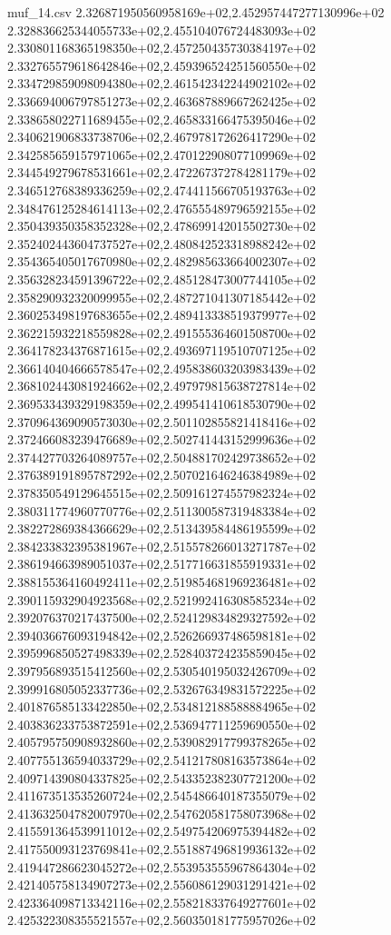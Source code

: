 \begin{filecontents*}{muf_14.csv}
2.326871950560958169e+02,2.452957447277130996e+02
2.328836625344055733e+02,2.455104076724483093e+02
2.330801168365198350e+02,2.457250435730384197e+02
2.332765579618642846e+02,2.459396524251560550e+02
2.334729859098094380e+02,2.461542342244902102e+02
2.336694006797851273e+02,2.463687889667262425e+02
2.338658022711689455e+02,2.465833166475395046e+02
2.340621906833738706e+02,2.467978172626417290e+02
2.342585659157971065e+02,2.470122908077109969e+02
2.344549279678531661e+02,2.472267372784281179e+02
2.346512768389336259e+02,2.474411566705193763e+02
2.348476125284614113e+02,2.476555489796592155e+02
2.350439350358352328e+02,2.478699142015502730e+02
2.352402443604737527e+02,2.480842523318988242e+02
2.354365405017670980e+02,2.482985633664002307e+02
2.356328234591396722e+02,2.485128473007744105e+02
2.358290932320099955e+02,2.487271041307185442e+02
2.360253498197683655e+02,2.489413338519379977e+02
2.362215932218559828e+02,2.491555364601508700e+02
2.364178234376871615e+02,2.493697119510707125e+02
2.366140404666578547e+02,2.495838603203983439e+02
2.368102443081924662e+02,2.497979815638727814e+02
2.369533439329198359e+02,2.499541410618530790e+02
2.370964369090573030e+02,2.501102855821418416e+02
2.372466083239476689e+02,2.502741443152999636e+02
2.374427703264089757e+02,2.504881702429738652e+02
2.376389191895787292e+02,2.507021646246384989e+02
2.378350549129645515e+02,2.509161274557982324e+02
2.380311774960770776e+02,2.511300587319483384e+02
2.382272869384366629e+02,2.513439584486195599e+02
2.384233832395381967e+02,2.515578266013271787e+02
2.386194663989051037e+02,2.517716631855919331e+02
2.388155364160492411e+02,2.519854681969236481e+02
2.390115932904923568e+02,2.521992416308585234e+02
2.392076370217437500e+02,2.524129834829327592e+02
2.394036676093194842e+02,2.526266937486598181e+02
2.395996850527498339e+02,2.528403724235859045e+02
2.397956893515412560e+02,2.530540195032426709e+02
2.399916805052337736e+02,2.532676349831572225e+02
2.401876585133422850e+02,2.534812188588884965e+02
2.403836233753872591e+02,2.536947711259690550e+02
2.405795750908932860e+02,2.539082917799378265e+02
2.407755136594033729e+02,2.541217808163573864e+02
2.409714390804337825e+02,2.543352382307721200e+02
2.411673513535260724e+02,2.545486640187355079e+02
2.413632504782007970e+02,2.547620581758073968e+02
2.415591364539911012e+02,2.549754206975394482e+02
2.417550093123769841e+02,2.551887496819936132e+02
2.419447286623045272e+02,2.553953555967864304e+02
2.421405758134907273e+02,2.556086129031291421e+02
2.423364098713342116e+02,2.558218337649277601e+02
2.425322308355521557e+02,2.560350181775957026e+02

\end{filecontents*}
